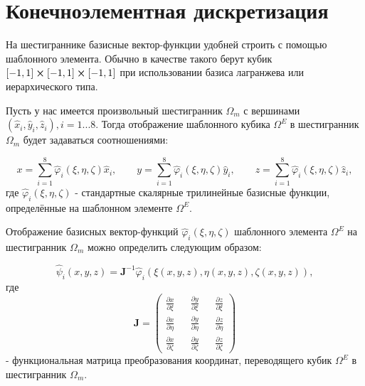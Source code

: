 \section{Конечноэлементная дискретизация}

На шестиграннике базисные вектор-функции удобней строить с помощью шаблонного элемента. Обычно в качестве такого берут кубик $\left[-1, 1\right] \cross \left[-1, 1\right] \cross \left[-1, 1\right]$ при использовании базиса лагранжева или иерархического типа.

Пусть у нас имеется произвольный шестигранник $\Omega_m$ с вершинами $\left(\hat{x}_i, \hat{y}_i, \hat{z}_i\right), i = 1...8$. Тогда отображение шаблонного кубика $\Omega^E$ в шестигранник $\Omega_m$ будет задаваться соотношениями:

\begin{equation} \label{eq_1_8}
	x = \sum_{i=1}^8 \hat{\varphi}_i (\xi, \eta, \zeta)\hat{x}_i, \qquad  y = \sum_{i=1}^8 \hat{\varphi}_i (\xi, \eta, \zeta)\hat{y}_i, \qquad  z = \sum_{i=1}^8 \hat{\varphi}_i (\xi, \eta, \zeta)\hat{z}_i,
\end{equation}
где $\hat{\varphi}_i (\xi, \eta, \zeta)$ - стандартные скалярные трилинейные базисные функции, определённые на шаблонном элементе $\Omega^E$.

Отображение базисных вектор-функций $\hat{\varphi}_i (\xi, \eta, \zeta)$ шаблонного элемента $\Omega^E$ на шестигранник $\Omega_m$ можно определить следующим образом:

\begin{equation} \label{eq_1_9}
	\hat{\text{$\psi$}}_i (x, y, z) = \textbf{J}^{-1} \hat{\varphi}_i (\xi(x, y, z), \eta(x, y, z), \zeta(x, y, z)),
\end{equation}
где 
\begin{equation} \label{eq_1_10}
	\textbf{J} = 
	\begin{pmatrix}
		\frac{\partial x}{\partial \xi} && \frac{\partial y}{\partial \xi} && \frac{\partial z}{\partial \xi} \\
		
		\frac{\partial x}{\partial \eta} && \frac{\partial y}{\partial \eta} && \frac{\partial z}{\partial \eta} \\
		
		\frac{\partial x}{\partial \zeta} && \frac{\partial y}{\partial \zeta} && \frac{\partial z}{\partial \zeta}
	\end{pmatrix}
\end{equation}
 - функциональная матрица преобразования координат, переводящего кубик $\Omega^E$ в шестигранник $\Omega_m$.

